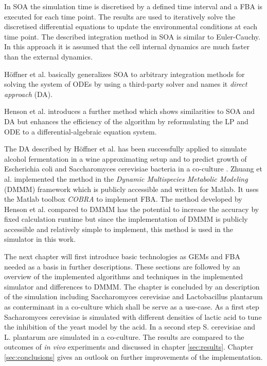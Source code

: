 In SOA the simulation time is discretised by a defined time interval and a FBA is executed for
each time point. The results are used to iteratively solve the discretised differential equations
to update the environmental conditions at each time point. The described integration method in SOA
is similar to Euler-Cauchy.
In this approach it is assumed that the cell internal dynamics are much faster than the external dynamics.

Höffner et al. basically generalizes SOA to arbitrary integration methods for solving the system of ODEs
by using a third-party solver and names it \textit{direct approach} (DA)\cite{hoffner_reliable_2013}.

Henson et al. introduces a further method which shows similarities to SOA and DA but enhances the efficiency of the
algorithm\cite{hoffner_reliable_2013} by reformulating the LP and ODE to a 
differential-algebraic equation system\cite{henson_dynamic_2014}.

The DA described by Höffner et al. has been successfully applied to simulate alcohol fermentation
in a wine approximating setup \cite{sainz_modeling_2003} \cite{pizarro_coupling_2007} and to
predict growth of Escherichia coli and Saccharomyces cerevisiae bacteria in a co-culture
\cite{hanly_dynamic_2011}. Zhuang et al. implemented
the method in the \textit{Dynamic Multispecies Metabolic Modeling} (DMMM) framework
which is publicly accessible and written for Matlab\cite{zhuang_design_2012}. It uses the Matlab
toolbox \textit{COBRA}\cite{heirendt_creation_nodate} to implement FBA.
The method developed by Henson et al. compared to DMMM has the potential to increase the accuracy
by fixed calculation runtime but since the implementation of DMMM is publicly accessible and
relatively simple to implement, this method is used in the simulator in this work.

The next chapter will first introduce basic technologies as GEMs and FBA needed as a basis in
further descriptions. These sections are followed by an overview of the implemented algorithms
and techniques in the implemented simulator and differences to DMMM. The chapter is concluded by
an description of the simulation including Saccharomyces cerevisiae and Lactobacillus plantarum
as conterminant in a co-culture which shall be serve as a use-case.
As a first step Sacharomyces cerevisiae is simulated with
different densities of lactic acid to tune the inhibition of the yeast model by the acid. In a
second step S. cerevisiae and L. plantarum are simulated in a co-culture.
The results are compared to the outcomes of \textit{in vivo} experiments and discussed in chapter \ref{sec:results}.
Chapter \ref{sec:conclusions} gives an outlook on further improvements of the implementation.

